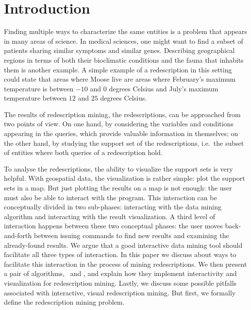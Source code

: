\section{Introduction}

Finding multiple ways to characterize the same entities is a problem
that appears in many areas of science.  In medical sciences, one might
want to find a subset of patients sharing similar symptoms and similar
genes. Describing geographical regions in terms of both their
bioclimatic conditions and the fauna that inhabits them is another
example.  A simple example of a redescription in this setting could
state that areas where Moose live are areas where February's maximum
temperature is between $-10$ and $0$ degrees Celsius and July's
maximum temperature between $12$ and $25$ degrees Celsius.

The results of redescription mining, the redescriptions, can be
approached from two points of view. On one hand, by considering the
variables and conditions appearing in the queries, which provide
valuable information in themselves; on the other hand, by studying the
support set of the redescriptions, i.e.\ the subset of entities where
both queries of a redescription hold. 
 
To analyse the
redescriptions, the ability to visualize the support sets is very
helpful. With geospatial data, the visualization is rather simple:
plot the support sets in a map. But just plotting the results on a map
is not enough: the user must also be able to interact with the
program. This interaction can be conceptually divided in two
sub-phases: interacting with the data mining algorithm and interacting
with the result visualization. A third level of interaction happens
between these two conceptual phases: the user moves back-and-forth
between issuing commands to find new results and examining the
already-found results. We argue that a good interactive data mining
tool should facilitate all three types of interaction. In this paper
we discuss about ways to facilitate this interaction in the process of
mining redescriptions. We then present a pair of algorithms, \ReReMi\
and \Siren, and explain how they implement interactivity and
visualization for redescription mining. Lastly, we discuss some
possible pitfalls associated with interactive, visual redescription
mining. But first, we formally define the redescription mining
problem.

